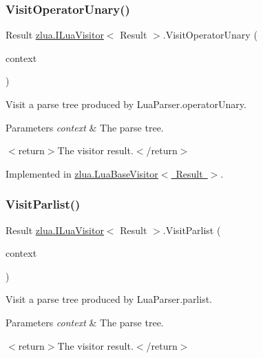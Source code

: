\subsubsection{\texorpdfstring{Visit\+Operator\+Unary()}{VisitOperatorUnary()}}
{\footnotesize\ttfamily Result \mbox{\hyperlink{interfacezlua_1_1_i_lua_visitor}{zlua.\+I\+Lua\+Visitor}}$<$ Result $>$.Visit\+Operator\+Unary (\begin{DoxyParamCaption}\item[{\mbox{[}\+Not\+Null\mbox{]} \mbox{\hyperlink{classzlua_1_1_lua_parser_1_1_operator_unary_context}{Lua\+Parser.\+Operator\+Unary\+Context}}}]{context }\end{DoxyParamCaption})}



Visit a parse tree produced by Lua\+Parser.\+operator\+Unary. 


\begin{DoxyParams}{Parameters}
{\em context} & The parse tree.\\
\hline
\end{DoxyParams}
$<$return$>$The visitor result.$<$/return$>$ 

Implemented in \mbox{\hyperlink{classzlua_1_1_lua_base_visitor_a3859047d2b178e3e90b387b1f694b496}{zlua.\+Lua\+Base\+Visitor$<$ Result $>$}}.

\mbox{\label{interfacezlua_1_1_i_lua_visitor_a8971a5b8bc82eb9d9ddfc1509538c293}} 
\subsubsection{\texorpdfstring{Visit\+Parlist()}{VisitParlist()}}
{\footnotesize\ttfamily Result \mbox{\hyperlink{interfacezlua_1_1_i_lua_visitor}{zlua.\+I\+Lua\+Visitor}}$<$ Result $>$.Visit\+Parlist (\begin{DoxyParamCaption}\item[{\mbox{[}\+Not\+Null\mbox{]} \mbox{\hyperlink{classzlua_1_1_lua_parser_1_1_parlist_context}{Lua\+Parser.\+Parlist\+Context}}}]{context }\end{DoxyParamCaption})}



Visit a parse tree produced by Lua\+Parser.\+parlist. 


\begin{DoxyParams}{Parameters}
{\em context} & The parse tree.\\
\hline
\end{DoxyParams}
$<$return$>$The visitor result.$<$/return$>$ 

